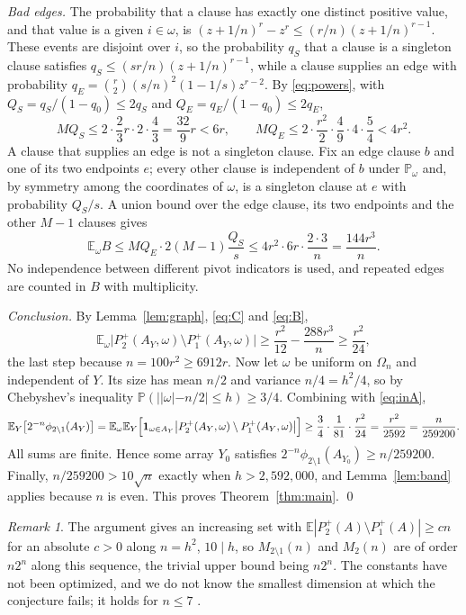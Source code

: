 \documentclass[11pt]{amsart}
\theoremstyle{definition}
\theoremstyle{remark}
\newtheorem{remark}[theorem]{Remark}
\numberwithin{equation}{section}
\newcommand{\Pp}{\mathbb P}
\newcommand{\E}{\mathbb E}
\begin{document}
\emph{Bad edges.} The probability that a clause has exactly one distinct positive value, and that value is a given $i\in\omega$, is $(z+1/n)^r-z^r\le(r/n)(z+1/n)^{r-1}$. These events are disjoint over $i$, so the probability $q_S$ that a clause is a singleton clause satisfies $q_S\le(sr/n)(z+1/n)^{r-1}$, while a clause supplies an edge with probability $q_E=\binom r2(s/n)^2(1-1/s)z^{r-2}$. By \eqref{eq:powers}, with $Q_S=q_S/(1-q_0)\le2q_S$ and $Q_E=q_E/(1-q_0)\le2q_E$,
\[
MQ_S\le2\cdot\frac{2}{3}r\cdot2\cdot\frac43=\frac{32}{9}r<6r,\qquad MQ_E\le2\cdot\frac{r^2}{2}\cdot\frac49\cdot4\cdot\frac54<4r^2 .
\]
A clause that supplies an edge is not a singleton clause. Fix an edge clause $b$ and one of its two endpoints $e$; every other clause is independent of $b$ under $\Pp_\omega$ and, by symmetry among the coordinates of $\omega$, is a singleton clause at $e$ with probability $Q_S/s$. A union bound over the edge clause, its two endpoints and the other $M-1$ clauses gives
\begin{equation}\label{eq:B}
\E_\omega B\le MQ_E\cdot2(M-1)\frac{Q_S}{s}\le4r^2\cdot6r\cdot\frac{2\cdot3}{n}=\frac{144r^3}{n}.
\end{equation}
No independence between different pivot indicators is used, and repeated edges are counted in $B$ with multiplicity.

\emph{Conclusion.} By Lemma~\ref{lem:graph}, \eqref{eq:C} and \eqref{eq:B},
\[
\E_\omega\bigl|P_2^+(A_Y,\omega)\setminus P_1^+(A_Y,\omega)\bigr|\ge\frac{r^2}{12}-\frac{288r^3}{n}\ge\frac{r^2}{24},
\]
the last step because $n=100r^2\ge6912r$. Now let $\omega$ be uniform on $\Omega_n$ and independent of $Y$. Its size has mean $n/2$ and variance $n/4=h^2/4$, so by Chebyshev's inequality $\Pp(||\omega|-n/2|\le h)\ge3/4$. Combining with \eqref{eq:inA},
\[
\E_Y\bigl[2^{-n}\phi_{2\setminus1}(A_Y)\bigr]=\E_{\omega}\E_Y\Bigl[\mathbf 1_{\omega\in A_Y}\bigl|P_2^+(A_Y,\omega)\setminus P_1^+(A_Y,\omega)\bigr|\Bigr]\ge\frac34\cdot\frac1{81}\cdot\frac{r^2}{24}=\frac{r^2}{2592}=\frac{n}{259200}.
\]
All sums are finite. Hence some array $Y_0$ satisfies $2^{-n}\phi_{2\setminus1}(A_{Y_0})\ge n/259200$. Finally, $n/259200>10\sqrt n$ exactly when $h>2{,}592{,}000$, and Lemma~\ref{lem:band} applies because $n$ is even. This proves Theorem~\ref{thm:main}. \qed

\begin{remark}
The argument gives an increasing set with $\E|P_2^+(A)\setminus P_1^+(A)|\ge cn$ for an absolute $c>0$ along $n=h^2$, $10\mid h$, so $M_{2\setminus1}(n)$ and $M_2(n)$ are of order $n2^n$ along this sequence, the trivial upper bound being $n2^n$. The constants have not been optimized, and we do not know the smallest dimension at which the conjecture fails; it holds for $n\le7$ \cite{C}.
\end{remark}
\end{document}
